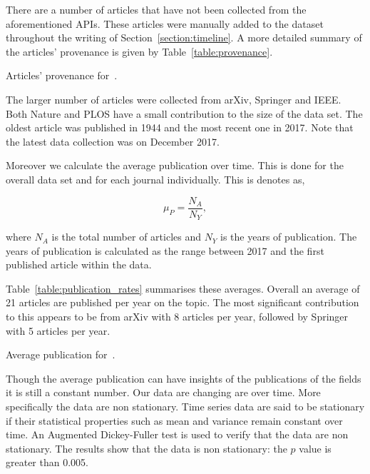 \documentclass{article}
\theoremstyle{definition}
\newcommand{\manual}{}
\begin{document}
There are a number of \manual articles that have not been collected from the
aforementioned APIs. These articles were manually added to the dataset throughout
the writing of Section~\ref{section:timeline}. A more detailed summary of the 
articles' provenance is given by Table~\ref{table:provenance}.

\begin{table}[!hbtp]
    \begin{center}
    
    \end{center}
    \caption{Articles' provenance for~\cite{}.}
    \label{table:provenance}
\end{table}

The larger number of articles were collected from arXiv, Springer and IEEE. Both
Nature and PLOS have a small contribution to the size of the data set. The oldest
article was published in 1944 and the most recent one in 2017. Note
that the latest data collection was on December 2017.

Moreover we calculate the average publication over time. This is done for the overall
data set and for each journal individually. This is denotes as,

\[ \mu_P = \frac{N_A}{N_Y},\]

where \(N_A\) is the total number of articles and \(N_Y\) is the years of publication.
The years of publication is calculated as the range between 2017 and the first published
article within the data.

Table~\ref{table:publication_rates} summarises these averages. Overall an average of
21 articles are published per year on the topic. The most significant contribution
to this appears to be from arXiv with 8 articles per year, followed by Springer
with 5 articles per year.

\begin{table}[!hbtp]
    \begin{center}
    
    \end{center}
    \caption{Average publication for~\cite{}.}
    \label{table:publication_rates}
\end{table}

Though the average publication can have insights of the publications of the fields
it is still a constant number. Our data are changing are over time. More specifically
the data are non stationary. Time series data are said to be stationary if their
statistical properties such as mean and variance remain constant over time. An
Augmented Dickey-Fuller test is used to verify that the data are non stationary.
The results show that the data is non stationary: the \(p\) value is greater than 0.005.
\end{document}
